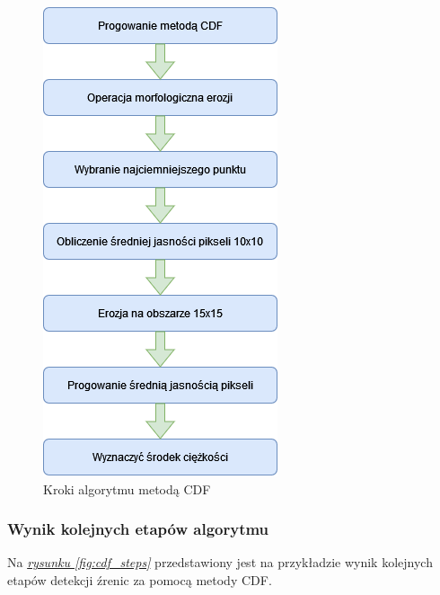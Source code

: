 \begin{figure}[!h]
    \begin{center}
        \includegraphics[scale=0.35]{img/pupil_section/CDF_Diagram.png}
        \caption{Kroki algorytmu metodą CDF}
        \label{fig:cdf_diagram}
    \end{center}
\end{figure}

\subsubsection{Wynik kolejnych etapów algorytmu}
Na \hyperref[{fig:cdf_steps}]{\textit{rysunku \ref{fig:cdf_steps}}} przedstawiony jest na przykładzie wynik kolejnych etapów detekcji źrenic za pomocą metody CDF.

